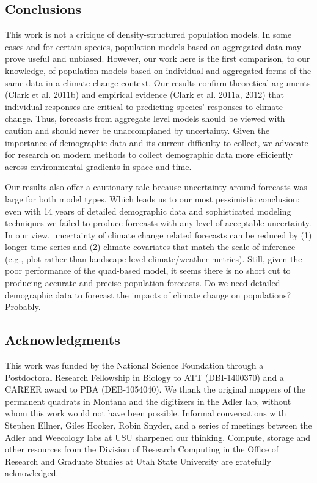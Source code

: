\documentclass[12pt,]{article}
\begin{document}
\subsection{Conclusions}\label{conclusions}

This work is not a critique of density-structured population models. In
some cases and for certain species, population models based on
aggregated data may prove useful and unbiased. However, our work here is
the first comparison, to our knowledge, of population models based on
individual and aggregated forms of the same data in a climate change
context. Our results confirm theoretical arguments (Clark et al. 2011b)
and empirical evidence (Clark et al. 2011a, 2012) that individual
responses are critical to predicting species' responses to climate
change. Thus, forecasts from aggregate level models should be viewed
with caution and should never be unaccompianed by uncertainty. Given the
importance of demographic data and its current difficulty to collect, we
advocate for research on modern methods to collect demographic data more
efficiently across environmental gradients in space and time.

Our results also offer a cautionary tale because uncertainty around
forecasts was large for both model types. Which leads us to our most
pessimistic conclusion: even with 14 years of detailed demographic data
and sophisticated modeling techniques we failed to produce forecasts
with any level of acceptable uncertainty. In our view, uncertainty of
climate change related forecasts can be reduced by (1) longer time
series and (2) climate covariates that match the scale of inference
(e.g., plot rather than landscape level climate/weather metrics). Still,
given the poor performance of the quad-based model, it seems there is no
short cut to producing accurate and precise population forecasts. Do we
need detailed demographic data to forecast the impacts of climate change
on populations? Probably.

\subsection{Acknowledgments}\label{acknowledgments}

This work was funded by the National Science Foundation through a
Postdoctoral Research Fellowship in Biology to ATT (DBI-1400370) and a
CAREER award to PBA (DEB-1054040). We thank the original mappers of the
permanent quadrats in Montana and the digitizers in the Adler lab,
without whom this work would not have been possible. Informal
conversations with Stephen Ellner, Giles Hooker, Robin Snyder, and a
series of meetings between the Adler and Weecology labs at USU sharpened
our thinking. Compute, storage and other resources from the Division of
Research Computing in the Office of Research and Graduate Studies at
Utah State University are gratefully acknowledged.
\end{document}
